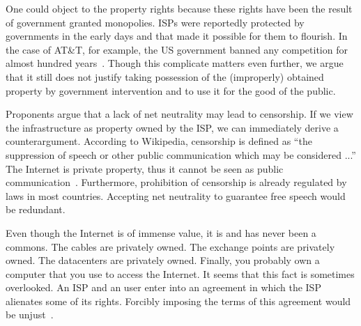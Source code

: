 One could object to the property rights because these rights have been the result of government granted monopolies. \acp{ISP} were reportedly protected by governments in the early days and that made it possible for them to flourish. In the case of AT\&T, for example, the US government banned any competition for almost hundred years~\cite{oa2014objectivists}. Though this complicate matters even further, we argue that it still does not justify taking possession of the (improperly) obtained property by government intervention and to use it for the good of the public.

Proponents argue that a lack of net neutrality may lead to censorship. If we view the infrastructure as property owned by the \ac{ISP}, we can immediately derive a counterargument. According to Wikipedia, censorship is defined as ``the suppression of speech or other public communication which may be considered ...'' The Internet is private property, thus it cannot be seen as public communication~\cite{falkvinge2014agree}. Furthermore, prohibition of censorship is already regulated by laws in most countries. Accepting net neutrality to guarantee free speech would be redundant.




Even though the Internet is of immense value, it is and has never been a commons. The cables are privately owned. The exchange points are privately owned. The datacenters are privately owned. Finally, you probably own a computer that you use to access the Internet. It seems that this fact is sometimes overlooked. An \ac{ISP} and an user enter into an agreement in which the \ac{ISP} alienates some of its rights. Forcibly imposing the terms of this agreement would be unjust~\cite{tech2014deon}.